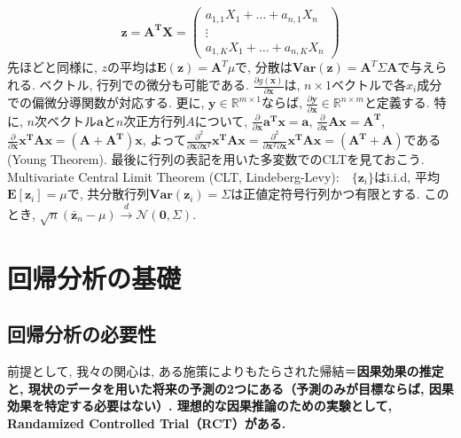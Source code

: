 \documentclass[paper=a4paper,fontsize=10pt]{jlreq}
\begin{document}
\begin{equation*}
  \mathbf{z}=\mathbf{A^T X} = \begin{pmatrix} a_{1, 1}X_1+\dots+a_{n, 1}X_n \\ \vdots \\ a_{1, K}X_1+\dots+a_{n, K}X_n \end{pmatrix}
\end{equation*}
先ほどと同様に, $z$の平均は$\mathbf{E(z)}=\mathbf{A}^T\mu$で, 分散は$\mathbf{Var(z)}=\mathbf{A}^T \Sigma \mathbf{A}$で与えられる. ベクトル, 行列での微分も可能である. $\frac{\partial g(\mathbf{x})}{\partial \mathbf{x}}$は, $n\times 1$ベクトルで各$x_i$成分での偏微分導関数が対応する. 更に, $\mathbf{y} \in \mathbb{R}^{m \times 1}$ならば, $\frac{\partial \mathbf{y}}{\partial \mathbf{x}} \in \mathbb{R}^{n \times m}$と定義する. 特に, $n$次ベクトル$\mathbf{a}$と$n$次正方行列$A$について, $\frac{\partial}{\partial \mathbf{x}}\mathbf{a^T x}=\mathbf{a}$, $\frac{\partial}{\partial \mathbf{x}}\mathbf{A x}=\mathbf{A^T}$, $\frac{\partial}{\partial \mathbf{x}}\mathbf{x^T A x}=\mathbf{(A+A^T)x}$, よって$\frac{\partial^2}{\partial \mathbf{x} \partial \mathbf{x}^T}\mathbf{x^T A x}=\frac{ \partial^2}{\partial \mathbf{x}^T \partial \mathbf{x}}\mathbf{x^T A x}=\mathbf{(A^T+A)}$である(\because Young Theorem). 最後に行列の表記を用いた多変数でのCLTを見ておこう. Multivariate Central Limit Theorem (CLT, Lindeberg-Levy):　$\{\mathbf{z}_i\}$はi.i.d, 平均$\mathbf{E}[\mathbf{z}_i]=\mu$で, 共分散行列$\mathbf{Var}(\mathbf{z}_i)=\Sigma$は正値定符号行列かつ有限とする. このとき, $\sqrt{n}(\bar{\mathbf{z}}_n-\mu) \overset{d}{\to}\mathcal{N}(\mathbf{0},\Sigma)$.\\

\section{回帰分析の基礎}
\subsection{回帰分析の必要性}
前提として, 我々の関心は, ある施策によりもたらされた帰結＝\rmfamily\mcfamily\bfseries{因果効果の推定}\mdseries と, 現状のデータを用いた\rmfamily\mcfamily\bfseries{将来の予測}\mdseries の2つにある（予測のみが目標ならば, 因果効果を特定する必要はない）. 理想的な因果推論のための実験として, \rmfamily\mcfamily\bfseries{Randamized Controlled Trial（RCT）}\mdseries がある.\\
\end{document}
